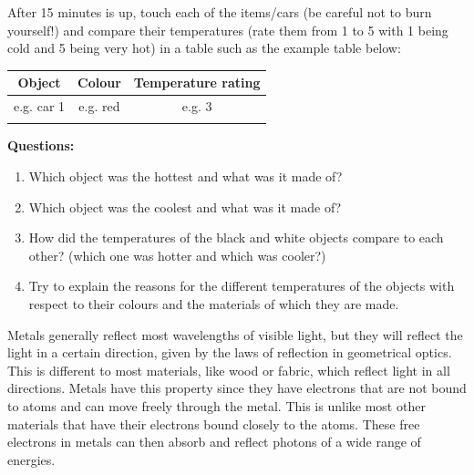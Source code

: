 {

After 15 minutes is up, touch each of the items/cars (be careful not to burn yourself!) and compare their temperatures (rate them from 1 to 5 with 1 being cold and 5 being very hot) in a table such as the example table below:

\begin{center}
\begin{tabular}{ | c | c | c |}
\hline
\textbf{Object} & \textbf{Colour} & \textbf{Temperature rating} \\ \hline \hline
e.g. car 1 & e.g. red & e.g. 3 \\ \hline
   &      &    \\
\hline
\end{tabular}
\end{center}

\textbf{Questions:}\\
\begin{enumerate}
\item Which object was the hottest and what was it made of?
\item Which object was the coolest and what was it made of?
\item How did the temperatures of the black and white objects compare to each other? (which one was hotter and which was cooler?)
\item Try to explain the reasons for the different temperatures of the objects with respect to their colours and the materials of which they are made. 
\end{enumerate}
}
 
Metals generally reflect most wavelengths of visible light, but they will reflect the light in a certain direction, given by the laws of reflection in geometrical optics.  This is different to most materials, like wood or fabric, which reflect light in all directions.  Metals have this property since they have electrons that are not bound to atoms and can move freely through the metal. This is unlike most other materials that have their electrons bound closely to the atoms.  These free electrons in metals can then absorb and reflect photons of a wide range of energies. 

